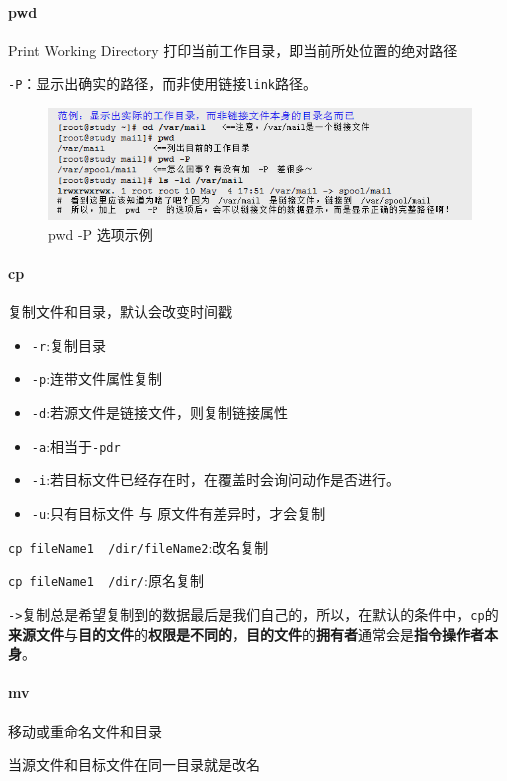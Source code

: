 \documentclass[UTF8,a4paper,12pt]{ctexbook}
\begin{document}
		\paragraph{pwd} Print Working Directory 打印当前工作目录，即当前所处位置的绝对路径
		
			\verb|-P|：显示出确实的路径，而非使用链接\verb|link|路径。
			
			\begin{figure}[h]
				\centering
				\includegraphics[scale=0.7]{figure/pwd.png}
				\caption{pwd -P 选项示例}
			\end{figure}
		\paragraph{cp} 复制文件和目录，默认会改变时间戳
			\begin{itemize}[itemindent = 1em]
				\item \verb|-r|:复制目录
				\item \verb|-p|:连带文件属性复制
				\item \verb|-d|:若源文件是链接文件，则复制链接属性
				\item \verb|-a|:相当于\verb|-pdr|
				\item \verb|-i|:若目标文件已经存在时，在覆盖时会询问动作是否进行。
				\item \verb|-u|:只有目标文件 与 原文件有差异时，才会复制
			\end{itemize}
			
			\verb|cp fileName1  /dir/fileName2|:改名复制
			
			\verb|cp fileName1  /dir/|:原名复制
			
			\verb|->|复制总是希望复制到的数据最后是我们自己的，所以，在默认的条件中，\verb|cp|的\textbf{来源文件}与\textbf{目的文件}的\textbf{权限是不同的}，\textbf{目的文件}的\textbf{拥有者}通常会是\textbf{指令操作者本身}。
			
		\paragraph{mv} 移动或重命名文件和目录
		
			当源文件和目标文件在同一目录就是改名
			
\end{document}
